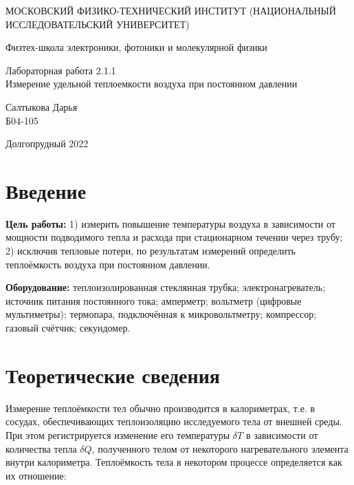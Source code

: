 \documentclass[a4paper,12pt]{article} %
\begin{document}
	
	\begin{titlepage}
	\begin{center}
		{\large МОСКОВСКИЙ ФИЗИКО-ТЕХНИЧЕСКИЙ ИНСТИТУТ (НАЦИОНАЛЬНЫЙ ИССЛЕДОВАТЕЛЬСКИЙ УНИВЕРСИТЕТ)}
	\end{center}
	\begin{center}
		{\large Физтех-школа электроники, фотоники и молекулярной физики}
	\end{center}
	
	
	\vspace{4.5cm}
	{\huge
		\begin{center}
			{Лабораторная работа 2.1.1}\\
			Измерение удельной теплоемкости воздуха при постоянном давлении
		\end{center}
	}
	\vspace{2cm}
	\begin{flushright}
		{\LARGE Салтыкова Дарья \\
			\vspace{0.5cm}
			Б04-105}
	\end{flushright}
	\vspace{8cm}
	\begin{center}
		Долгопрудный 2022
	\end{center}
\end{titlepage}

\section{Введение}

\textbf{Цель работы:} 1) измерить повышение температуры воздуха в зависимости от мощности подводимого тепла и расхода при стационарном течении через трубу; 
2) исключив тепловые потери, по результатам измерений определить теплоёмкость воздуха при постоянном давлении.
\medskip

\noindent \textbf{Оборудование:} теплоизолированная стеклянная трубка; электронагреватель; источник питания постоянного тока; амперметр; вольтметр (цифровые мультиметры); термопара, подключённая к микровольтметру; компрессор; газовый счётчик; секундомер.

\section{Теоретические сведения}

\noindent Измерение теплоёмкости тел обычно производится в калориметрах, т.е. в сосудах, обеспечивающих теплоизоляцию исследуемого тела от внешней среды. При этом регистрируется изменение его температуры $\delta T$ в зависимости от количества тепла $\delta Q$, полученного телом от некоторого нагревательного элемента внутри калориметра. Теплоёмкость тела в некотором процессе определяется как их отношение:
\end{document}
